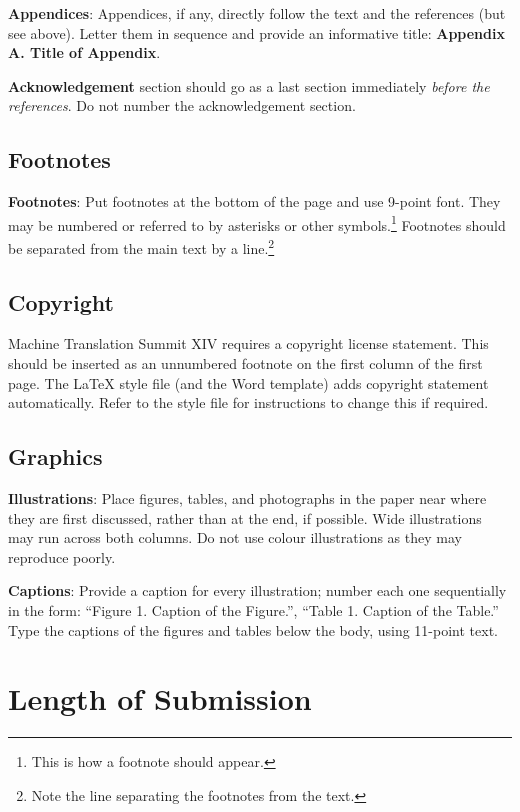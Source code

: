 \documentclass[11pt]{article}
\newcommand{\confname}{Machine Translation Summit XIV}
\begin{document}
{\bf Appendices}: Appendices, if any, directly follow the text and the
references (but see above).  Letter them in sequence and provide an
informative title: {\bf Appendix A. Title of Appendix}.

\textbf{Acknowledgement} section should go as a last section immediately
\textit{before the references}.  Do not number the acknowledgement section.

\subsection{Footnotes}

{\bf Footnotes}: Put footnotes at the bottom of the page and use
9-point font. They may be numbered or referred to by asterisks or
other symbols.\footnote{This is how a footnote should appear.}
Footnotes should be separated from the main text by a
line.\footnote{Note the line separating the footnotes from the text.}

\subsection{Copyright}

\confname{} requires a copyright license statement. This should be inserted as
an unnumbered footnote on the first column of the first page. The \LaTeX{} style file
(and the Word template) adds copyright statement automatically. Refer to the style file for instructions to
change this if required.

\subsection{Graphics}

{\bf Illustrations}: Place figures, tables, and photo\-graphs in the
paper near where they are first discussed, rather than at the end, if
possible.  Wide illustrations may run across both columns. Do not use
colour illustrations as they may reproduce poorly.

{\bf Captions}: Provide a caption for every illustration; number
each one sequentially in the form:  ``Figure 1. Caption of the
Figure.'', ``Table 1. Caption of the Table.''  Type the captions of
the figures and tables below the body, using 11-point text.


\section{Length of Submission}
\label{sec:length}
\end{document}

